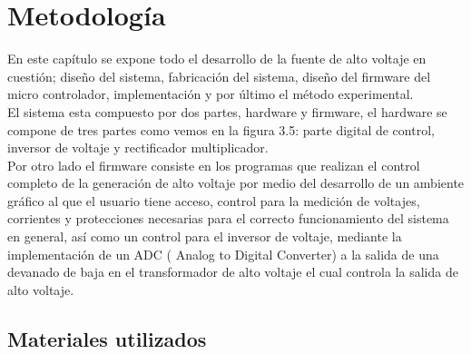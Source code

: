 



\chapter{Metodología}
En este capítulo se expone todo el desarrollo de la fuente de alto voltaje en cuestión; diseño del sistema, fabricación del sistema, diseño del firmware del micro controlador, implementación y por último el método experimental.\\

El sistema esta compuesto por dos partes, hardware y firmware, el hardware se compone de tres partes como vemos en la figura 3.5: parte digital de control, inversor de voltaje y rectificador multiplicador. \\

Por otro lado el firmware consiste en los programas que realizan el control completo de la generación de alto voltaje por medio del desarrollo de un ambiente gráfico al que el usuario tiene acceso,  control para la medición de voltajes, corrientes y protecciones necesarias para el correcto funcionamiento del sistema en general, así como un control para el inversor de voltaje, mediante la implementación de un ADC ( Analog to Digital Converter) a la salida de una devanado de baja en el transformador de alto voltaje el cual controla la salida de alto voltaje.
\newpage





\section{Materiales utilizados}

